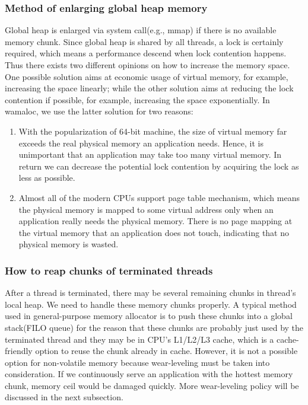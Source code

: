 \documentclass[10pt, conference, compsocconf]{IEEEtran}
\begin{document}
\subsubsection{Method of enlarging global heap memory}
Global heap is enlarged via system call(e.g., mmap) if there is no available memory chunk.
Since global heap is shared by all threads, a lock is certainly required, which means a performance descend when lock contention happens.
Thus there exists two different opinions on how to increase the memory space. 
One possible solution aims at economic usage of virtual memory, for example, increasing the space linearly;
while the other solution aims at reducing the lock contention if possible, for example, increasing the space exponentially. 
In wamaloc, we use the latter solution for two reasons: 
\begin{enumerate}
    \item With the popularization of 64-bit machine, the size of virtual memory far exceeds the real physical memory an application needs.
Hence, it is unimportant that an application may take too many virtual memory. In return we can decrease the potential lock contention by acquiring the lock as less as possible.
    \item Almost all of the modern CPUs support page table mechanism, 
        which means the physical memory is mapped to some virtual address only when an application really needs the physical memory. 
        There is no page mapping at the virtual memory that an application does not touch, indicating that no physical memory is wasted.
\end{enumerate}

\subsubsection{How to reap chunks of terminated threads}
After a thread is terminated, there may be several remaining chunks in thread's local heap. 
We need to handle these memory chunks properly.
A typical method used in general-purpose memory allocator is to push these chunks into a global stack(FILO queue)
for the reason that these chunks are probably just used by the terminated thread and they may be in CPU's L1/L2/L3 cache, which is a cache-friendly option to reuse the chunk already in cache.
However, it is not a possible option for non-volatile memory because wear-leveling must be taken into consideration.
If we continuously serve an application with the hottest memory chunk, memory ceil would be damaged quickly.
More wear-leveling policy will be discussed in the next subsection.
\end{document}
